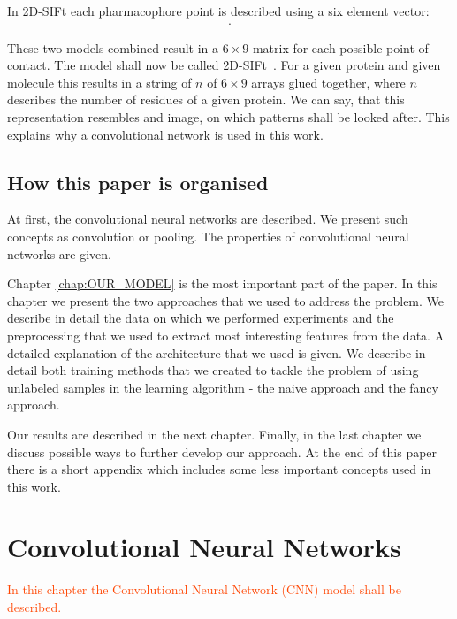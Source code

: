 \documentclass[a4paper,10pt]{report}
\newcommand{\igor}[1]{\textcolor{OrangeRed}{#1}}
\begin{document}
    In 2D-SIFt each pharmacophore point is described using a six element vector:
    \begin{align*}
    [\text{H-bond donor},&\text{H-bond acceptor},\text{hydrophobic}, \\
    &\text{negatively charged},\text{positively charged},\text{aromatic}].
    \end{align*}



    These two models combined result in a $6\times{}9$ matrix for each possible point of contact. The model shall now be called 2D-SIFt~\cite{Mordalski2011}. For a given protein and given molecule this results in a string of $n$ of $6\times{}9$ arrays glued together, where $n$ describes the number of residues of a given protein. We can say, that this representation resembles and image, on which patterns shall be looked after. This explains why a convolutional network is used in this work.
      
   
    \section{How this paper is organised}
    
    At first, the convolutional neural networks are described. We present such concepts as convolution or pooling. The properties of convolutional neural networks are given. 
    
    Chapter \ref{chap:OUR_MODEL} is the most important part of the paper. In this chapter we present the two approaches that we used to address the problem. We describe in detail the data on which we performed experiments and the preprocessing that we used to extract most interesting features from the data. A detailed explanation of the architecture that we used is given. We describe in detail both training methods that we created to tackle the problem of using unlabeled samples in the learning algorithm - the naive approach and the fancy approach. 
    
    Our results are described in the next chapter. Finally, in the last chapter we discuss possible ways to further develop our approach. At the end of this paper there is a short appendix which includes some less important concepts used in this work.
    

  \chapter{Convolutional Neural Networks}
  \igor{In this chapter the Convolutional Neural Network (CNN) model shall be described.}
  
\end{document}
